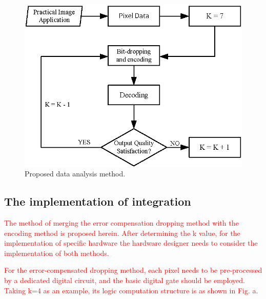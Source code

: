 \documentclass[lettersize,journal]{IEEEtran}
\begin{document}
 \begin{figure}[htb]
 	\centering
 	\includegraphics[width=\linewidth]{Fig/Proposed data analysis method.png}
 	\caption{Proposed data analysis method.}
 	\label{fig5}
 \end{figure}

{\color{red}\subsection{The implementation of integration}}

\textcolor{red}{The method of merging the error compensation dropping method with the encoding method is proposed herein. After determining the k value, for the implementation of specific hardware the hardware designer needs to consider the implementation of both methods.}

\textcolor{red}{For the error-compensated dropping method, each pixel needs to be pre-processed by a dedicated digital circuit, and the basic digital gate should be employed. Taking k=4 as an example, its logic computation structure is as shown in Fig. a.}
\end{document}
